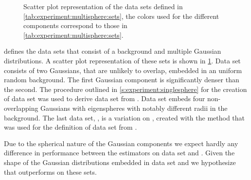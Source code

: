 
\begin{figure}[b]
	\centering
	
	\caption{Scatter plot representation of the data sets defined in \cref{tab:experiment:multisphere:sets}, the colors used for the different components correspond to those in \cref{tab:experiment:multisphere:sets}.}
	\label{fig:experiment:multisphere:sets}
\end{figure}

 defines the data sets that consist of a background and multiple Gaussian distributions. A scatter plot representation of these sets is shown in \cref{fig:experiment:multisphere:sets}.
	Data set \ferdosiTwo consists of two Gaussians, that are unlikely to overlap, embedded in an uniform random background. The first Gaussian component is significantly denser than the second.
	The procedure outlined in \cref{s:experiment:singlesphere} for the creation of data set \baakmanOne was used to derive data set \baakmanTwo from \ferdosiTwo.
	Data set \ferdosiThree embeds four non-overlapping Gaussians with eigenspheres with notably different radii in the background.
	The last data set, \baakmanThree, is a variation on \ferdosiThree, created with the method that was used for the definition of data set \baakmanOne from \ferdosiOne.

	Due to the spherical nature of the Gaussian components we expect hardly any difference in performance between the estimators on data set \ferdosiTwo and \ferdosiThree. Given the shape of the Gaussian distributions embedded in data set \baakmanTwo and \baakmanThree we hypothesize that \sambe outperforms \mbe on these sets.